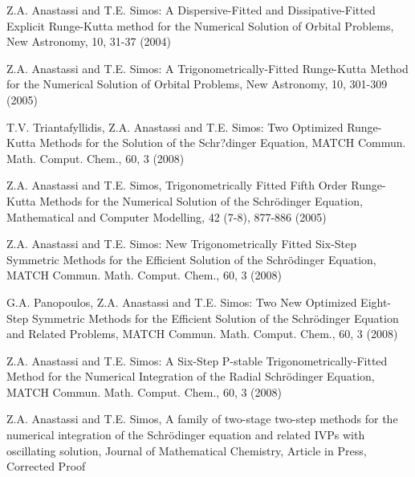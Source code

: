 \documentclass[numreferences]{kluwer}
\begin{document}
\begin{article}
\begin{thebibliography}{120}
 Z.A. Anastassi and T.E. Simos: A Dispersive-Fitted and Dissipative-Fitted Explicit Runge-Kutta method for the Numerical Solution of Orbital Problems, New Astronomy, 10, 31-37 (2004)

 Z.A. Anastassi and T.E. Simos: A Trigonometrically-Fitted Runge-Kutta Method for the Numerical Solution of Orbital Problems, New Astronomy, 10, 301-309 (2005)

 T.V. Triantafyllidis, Z.A. Anastassi and T.E. Simos: Two Optimized Runge-Kutta Methods for the Solution of the Schr?dinger Equation, MATCH Commun. Math. Comput. Chem., 60, 3 (2008)

 Z.A. Anastassi and T.E. Simos, Trigonometrically Fitted Fifth Order Runge-Kutta Methods for the Numerical Solution of the Schr\"{o}dinger Equation, Mathematical and Computer Modelling, 42 (7-8), 877-886 (2005)

 Z.A. Anastassi and T.E. Simos: New Trigonometrically Fitted Six-Step Symmetric Methods for the Efficient Solution of the Schr\"odinger Equation, MATCH Commun. Math. Comput. Chem., 60, 3 (2008)

 G.A. Panopoulos, Z.A. Anastassi and T.E. Simos: Two New Optimized Eight-Step Symmetric Methods for the Efficient Solution of the Schr\"{o}dinger Equation and Related Problems, MATCH Commun. Math. Comput. Chem., 60, 3 (2008)

 Z.A. Anastassi and T.E. Simos: A Six-Step P-stable Trigonometrically-Fitted Method for the Numerical Integration of the Radial Schr\"odinger Equation, MATCH Commun. Math. Comput. Chem., 60, 3 (2008)

 Z.A. Anastassi and T.E. Simos, A family of two-stage two-step methods for the numerical integration of the Schr\"odinger equation and related IVPs with oscillating solution, Journal of Mathematical Chemistry, Article in Press, Corrected Proof


\end{thebibliography}
\end{article}
\end{document}
